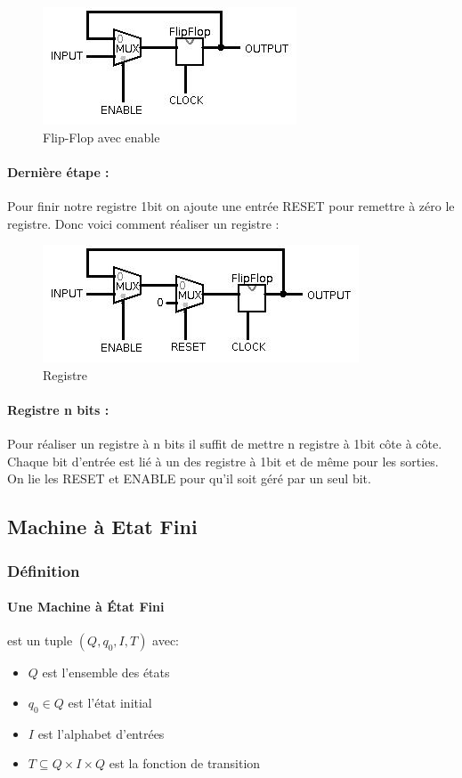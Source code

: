 \documentclass[10pt,a4paper,twoside]{article}
\begin{document}
\begin{figure}[hbtp]
\caption{Flip-Flop avec enable}
\centering
\includegraphics[scale=1]{FlipFlopEnable.jpg} 
\end{figure}
\FloatBarrier

\paragraph{Dernière étape :} Pour finir notre registre 1bit on ajoute une entrée RESET pour remettre à zéro le registre. Donc voici comment réaliser un registre :

\begin{figure}[hbtp]
\caption{Registre}
\centering
\includegraphics[scale=1]{Registre.jpg}
\end{figure}
\FloatBarrier

\paragraph{Registre n bits :} Pour réaliser un registre à n bits il suffit de mettre n registre à 1bit côte à côte. Chaque bit d'entrée est lié à un des registre à 1bit et de même pour les sorties. On lie les RESET et ENABLE pour qu'il soit géré par un seul bit.

\subsection{Machine à Etat Fini}
\subsubsection{Définition}
\paragraph{Une Machine à État Fini} est un tuple  $(Q,q_{0},I,T)$ avec:
\begin{itemize}
\item $Q$ est l'ensemble des états
\item $q_{0} \in Q$ est l'état initial
\item $I$ est l'alphabet d'entrées
\item $T \subseteq Q\times I\times Q$ est la fonction de transition
\end{itemize}
\end{document}

